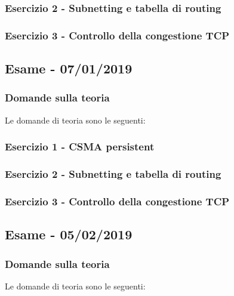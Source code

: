 \documentclass[a4paper]{article}
\begin{document}
	\subsubsection{Esercizio 2 - Subnetting e tabella di routing}
	
	\subsubsection{Esercizio 3 - Controllo della congestione TCP}

	\newpage

	\subsection[\textbf{Esame - 07/01/2019}]{Esame - 07/01/2019}

	\subsubsection{Domande sulla teoria}
	Le domande di teoria sono le seguenti:
	
	\subsubsection{Esercizio 1 - CSMA persistent}
	
	\subsubsection{Esercizio 2 - Subnetting e tabella di routing}
	
	\subsubsection{Esercizio 3 - Controllo della congestione TCP}

\newpage

	\subsection[\textbf{Esame - 05/02/2019}]{Esame - 05/02/2019}
	
	\subsubsection{Domande sulla teoria}
	Le domande di teoria sono le seguenti:
	
\end{document}
